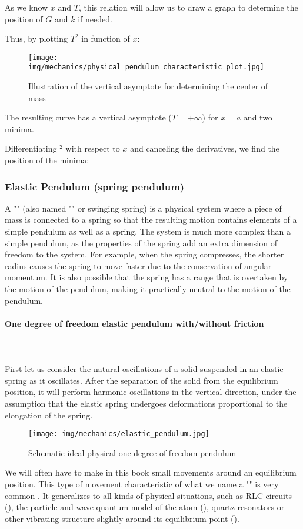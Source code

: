 	As we know $x$ and $T$, this relation will allow us to draw a graph to determine the position of $G$ and $k$ if needed.

	Thus, by plotting $T^2$ in function of $x$:
	\begin{figure}[H]
		\centering
		\texttt{[image: img/mechanics/physical\_pendulum\_characteristic\_plot.jpg]}
		\caption{Illustration of the vertical asymptote for determining the center of mass}
	\end{figure}
	The resulting curve has a vertical asymptote ($T=+\infty$) for $x=a$ and two minima.

	Differentiating $^2$ with respect to $x$ and canceling the derivatives, we find the position of the minima:
	
	
	\subsubsection{Elastic Pendulum (spring pendulum)}
	A "" (also named "" or swinging spring) is a physical system where a piece of mass is connected to a spring so that the resulting motion contains elements of a simple pendulum as well as a spring. The system is much more complex than a simple pendulum, as the properties of the spring add an extra dimension of freedom to the system. For example, when the spring compresses, the shorter radius causes the spring to move faster due to the conservation of angular momentum. It is also possible that the spring has a range that is overtaken by the motion of the pendulum, making it practically neutral to the motion of the pendulum.
	
	\paragraph{One degree of freedom elastic pendulum with/without friction}\mbox{}\\\\
	First let us consider the natural oscillations of a solid suspended in an elastic spring as it oscillates. After the separation of the solid from the equilibrium position, it will perform harmonic oscillations in the vertical direction, under the assumption that the elastic spring undergoes deformations proportional to the elongation of the spring.
	
	\begin{figure}[H]
		\centering
		\texttt{[image: img/mechanics/elastic\_pendulum.jpg]}
		\caption{Schematic ideal physical one degree of freedom pendulum}
	\end{figure}
	We will often have to make in this book small movements around an equilibrium position. This type of movement characteristic of what we name a "" is very common . It generalizes to all kinds of physical situations, such as RLC circuits (), the particle and wave quantum model of the atom (), quartz resonators or other vibrating structure slightly around its equilibrium point ().

